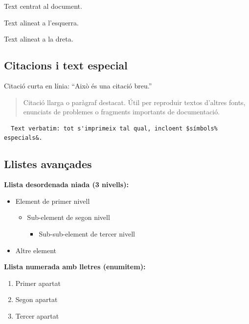 \documentclass[informe, catalan]{practicaitic}
\theoremstyle{definition}
\theoremstyle{remark}
\begin{document}
\begin{center}
  Text centrat al document.
\end{center}

\begin{flushleft}
  Text alineat a l'esquerra.
\end{flushleft}

\begin{flushright}
  Text alineat a la dreta.
\end{flushright}

\subsection{Citacions i text especial}

Citació curta en línia: ``Això és una citació breu.''

\begin{quote}
  Citació llarga o paràgraf destacat. Útil per reproduir textos d'altres fonts,
  enunciats de problemes o fragments importants de documentació.
\end{quote}

\begin{verbatim}
  Text verbatim: tot s'imprimeix tal qual, incloent $símbols% especials&.
\end{verbatim}

\subsection{Llistes avançades}

\textbf{Llista desordenada niada (3 nivells):}
\begin{itemize}
  \item Element de primer nivell
  \begin{itemize}
    \item Sub-element de segon nivell
    \begin{itemize}
      \item Sub-sub-element de tercer nivell
    \end{itemize}
  \end{itemize}
  \item Altre element
\end{itemize}

\textbf{Llista numerada amb lletres (enumitem):}
\begin{enumerate}[label=\alph*)]
  \item Primer apartat
  \item Segon apartat
  \item Tercer apartat
\end{enumerate}
\end{document}
